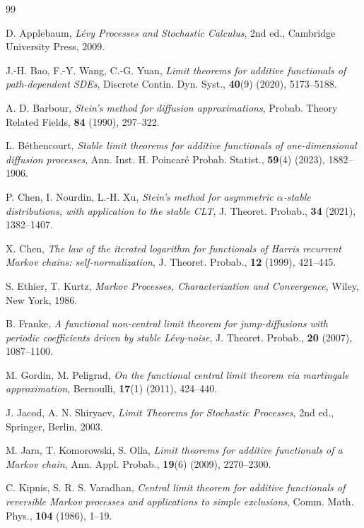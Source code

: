 \documentclass[11pt,reqno]{amsart}
\numberwithin{equation}{section}
\begin{document}
\begin{thebibliography}{99}
	
	
 D. Applebaum, \textit{Lévy Processes and Stochastic Calculus}, 2nd ed., Cambridge University Press, 2009.

 J.-H. Bao, F.-Y. Wang, C.-G. Yuan, \textit{Limit theorems for additive functionals of path-dependent SDEs}, Discrete Contin. Dyn. Syst., \textbf{40}(9) (2020), 5173--5188.

 A. D. Barbour, \textit{Stein's method for diffusion approximations}, Probab. Theory Related Fields, \textbf{84} (1990), 297--322.

 L. Béthencourt, \textit{Stable limit theorems for additive functionals of one-dimensional diffusion processes}, Ann. Inst. H. Poincaré Probab. Statist., \textbf{59}(4) (2023), 1882--1906.

 P. Chen, I. Nourdin, L.-H. Xu, \textit{Stein's method for asymmetric $\alpha$-stable distributions, with application to the stable CLT}, J. Theoret. Probab., \textbf{34} (2021), 1382--1407.

 X. Chen, \textit{The law of the iterated logarithm for functionals of Harris recurrent Markov chains: self-normalization}, J. Theoret. Probab., \textbf{12} (1999), 421--445.

 S. Ethier, T. Kurtz, \textit{Markov Processes, Characterization and Convergence}, Wiley, New York, 1986.



 B. Franke, \textit{A functional non-central limit theorem for jump-diffusions with periodic coefficients driven by stable Lévy-noise}, J. Theoret. Probab., \textbf{20} (2007), 1087--1100.

 M. Gordin, M. Peligrad, \textit{On the functional central limit theorem via martingale approximation}, Bernoulli, \textbf{17}(1) (2011), 424--440.

 J. Jacod, A. N. Shiryaev, \textit{Limit Theorems for Stochastic Processes}, 2nd ed., Springer, Berlin, 2003.

 M. Jara, T. Komorowski, S. Olla, \textit{Limit theorems for additive functionals of a Markov chain}, Ann. Appl. Probab., \textbf{19}(6) (2009), 2270--2300.

 C. Kipnis, S. R. S. Varadhan, \textit{Central limit theorem for additive functionals of reversible Markov processes and applications to simple exclusions}, Comm. Math. Phys., \textbf{104} (1986), 1--19.


\end{thebibliography}
\end{document}
